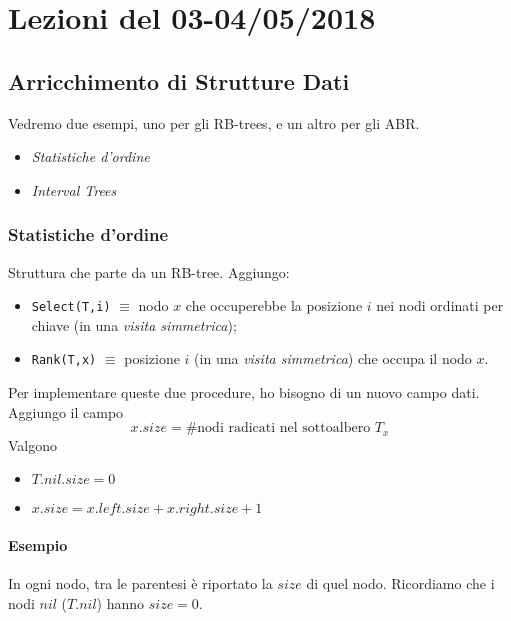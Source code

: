 \section{Lezioni del 03-04/05/2018}

\subsection{Arricchimento di Strutture Dati}

Vedremo due esempi, uno per gli RB-trees, e un altro per gli ABR.
\begin{itemize}[noitemsep]
    \item \emph{Statistiche d'ordine} %
    \item \emph{Interval Trees} %
\end{itemize}

\subsubsection{Statistiche d'ordine}
Struttura che parte da un RB-tree. Aggiungo:
\begin{itemize}
    \item \texttt{Select(T,i)} $\equiv$ nodo $x$ che occuperebbe la posizione $i$
        nei nodi ordinati per chiave (in una \emph{visita simmetrica});
    \item \texttt{Rank(T,x)} $\equiv$ posizione $i$ (in una \emph{visita simmetrica}) 
        che occupa il nodo $x$. 
\end{itemize}

Per implementare queste due procedure, ho bisogno di un nuovo campo dati. 
Aggiungo il campo 
$$x.size = \# \text{nodi radicati nel sottoalbero } T_x$$ 
Valgono
\begin{itemize}[label=,noitemsep]
    \item $T.nil.size = 0$
    \item $x.size = x.left.size + x.right.size + 1$
\end{itemize}

\paragraph{Esempio} In ogni nodo, tra le parentesi
è riportato la $size$ di quel nodo. Ricordiamo che i nodi $nil$ ($T.nil$)
hanno $size = 0$.

